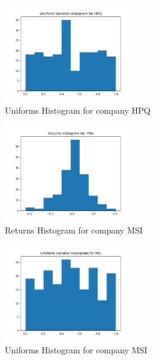 \documentclass[a4paper,12pt]{article}
\begin{document}
\begin{figure}[h]

\centering
\includegraphics[width=0.5\textwidth]{hpq_uniforms_histogram}
\caption{Uniforms Histogram for company HPQ}
\label{image-hpq_hist1}

\end{figure}

\begin{figure}[h]

\centering
\includegraphics[width=0.5\textwidth]{msi_returns_histogram}
\caption{Returns Histogram for company MSI}
\label{image-msi_hist}

\end{figure} 
 
\begin{figure}[h]

\centering
\includegraphics[width=0.5\textwidth]{msi_uniforms_histogram}
\caption{Uniforms Histogram for company MSI}
\label{image-msi_hist1}

\end{figure} 
 
\end{document}
